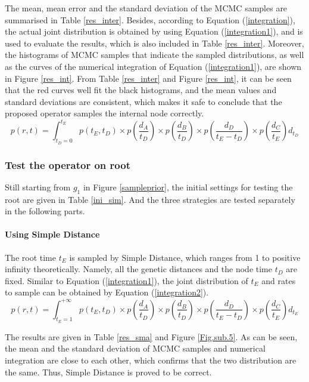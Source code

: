 \documentclass{bmcart}
\begin{document}
\begin{backmatter}
The mean, mean error and the standard deviation of the MCMC samples are summarised in Table \ref{res_inter}. Besides, according to Equation (\ref{integration}), the actual joint distribution is obtained by using Equation (\ref{integration1}), and is used to evaluate the results, which is also included in Table \ref{res_inter}. Moreover, the histograms of MCMC samples that indicate the sampled distributions, as well as the curves of the numerical integration of Equation (\ref{integration1}), are shown in Figure \ref{res_int}. From Table \ref{res_inter} and Figure \ref{res_int}, it can be seen that the red curves well fit the black histograms, and the mean values and standard deviations are consistent, which makes it safe to conclude that the proposed operator samples the internal node correctly.
\begin{equation}
\label{integration1}
p(r,t) = \int_{{t_D} = 0}^{{t_E}} {p({t_E},{t_D}) \times p(\frac{{{d_A}}}{{{t_D}}}) \times p(\frac{{{d_B}}}{{{t_D}}}) \times p(\frac{{{d_D}}}{{{t_E} - {t_D}}}) \times p(\frac{{{d_C}}}{{{t_E}}}){d_{t_D}}}
\end{equation}
\subsubsection*{Test the operator on root}
Still starting from $g_1$ in Figure \ref{sampleprior}, the initial settings for testing the root are given in Table \ref{ini_sim}. And the three strategies are tested separately in the following parts.

\paragraph*{Using Simple Distance}

The root time $t_E$ is sampled by Simple Distance, which ranges from 1 to positive infinity theoretically. Namely, all the genetic distances and the node time $t_D$  are fixed. Similar to Equation (\ref{integration1}), the joint distribution of $t_E$ and rates to sample can be obtained by Equation (\ref{integration2}).
\begin{equation}
\label{integration2}
p(r,t) = \int_{{t_E} = 1}^{ + \infty } {p({t_E},{t_D}) \times p(\frac{{{d_A}}}{{{t_D}}}) \times p(\frac{{{d_B}}}{{{t_D}}}) \times p(\frac{{{d_D}}}{{{t_E} - {t_D}}}) \times p(\frac{{{d_C}}}{{{t_E}}}){d_{t_E}}}
\end{equation}

The results are given in Table \ref{res_sma} and Figure \ref{Fig.sub.5}. As can be seen, the mean and the standard deviation of MCMC samples and numerical integration are close to each other, which confirms that the two distribution are the same. Thus, Simple Distance is proved to be correct.


\end{backmatter}
\end{document}
